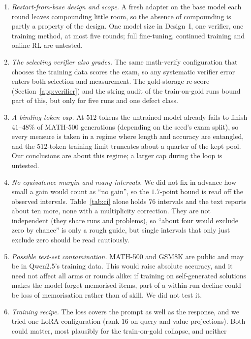 \documentclass[runningheads]{llncs}
\begin{document}
\begin{enumerate}
golds become parseable once boxed), so the two corrections must not be added.
The re-scored false-negative share assumes the re-scored verifier makes no
false accepts.
\item \emph{Restart-from-base design and scope.} A fresh adapter on the base
model each round leaves compounding little room, so the absence of compounding
is partly a property of the design. One model size in Design~I, one verifier,
one training method, at most five rounds; full fine-tuning, continued training
and online RL are untested.
\item \emph{The selecting verifier also grades.} The same math-verify
configuration that chooses the training data scores the exam, so any systematic
verifier error enters both selection and measurement. The gold-storage re-score
(Section~\ref{app:verifier}) and the string audit of the train-on-gold runs
bound part of this, but only for five runs and one defect class.
\item \emph{A binding token cap.} At $512$ tokens the untrained model already
fails to finish $41$--$48\%$ of MATH-500 generations (depending on the seed's
exam split), so every measure is taken in a
regime where length and accuracy are entangled, and the $512$-token training
limit truncates about a quarter of the kept pool. Our conclusions are about this
regime; a larger cap during the loop is untested.
\item \emph{No equivalence margin and many intervals.} We did not fix in advance
how small a gain would count as ``no gain'', so the $1.7$-point bound is read off
the observed intervals. Table~\ref{tab:ci} alone holds $76$ intervals and the
text reports about ten more, none with a multiplicity correction. They are not
independent (they share runs and problems), so ``about four would exclude zero
by chance'' is only a rough guide, but single intervals that only just exclude
zero should be read cautiously.
\item \emph{Possible test-set contamination.} MATH-500 and GSM8K are public and
may be in Qwen2.5's training data. This would raise absolute accuracy, and it
need not affect all arms or rounds alike: if training on self-generated
solutions makes the model forget memorised items, part of a within-run decline
could be loss of memorisation rather than of skill. We did not test it.
\item \emph{Training recipe.} The loss covers the prompt as well as the response,
and we tried one LoRA configuration (rank $16$ on query and value projections).
Both could matter, most plausibly for the train-on-gold collapse, and neither

\end{enumerate}
\end{document}
